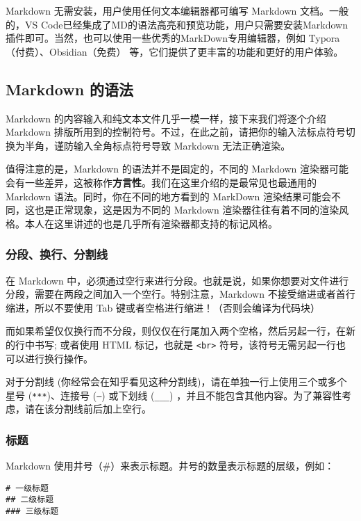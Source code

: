 \documentclass[../main.tex]{subfiles}
\begin{document}
Markdown 无需安装，用户使用任何文本编辑器都可编写 Markdown 文档。一般的，VS Code已经集成了MD的语法高亮和预览功能，用户只需要安装Markdown插件即可。当然，也可以使用一些优秀的MarkDown专用编辑器，例如 Typora（付费）、Obsidian（免费） 等，它们提供了更丰富的功能和更好的用户体验。

\subsection{Markdown 的语法}

Markdown 的内容输入和纯文本文件几乎一模一样，接下来我们将逐个介绍 Markdown 排版所用到的控制符号。不过，在此之前，请把你的输入法标点符号切换为半角，谨防输入全角标点符号导致 Markdown 无法正确渲染。

值得注意的是，Markdown 的语法并不是固定的，不同的 Markdown 渲染器可能会有一些差异，这被称作\textbf{方言性}。我们在这里介绍的是最常见也最通用的 Markdown 语法。同时，你在不同的地方看到的 MarkDown 渲染结果可能会不同，这也是正常现象，这是因为不同的 Markdown 渲染器往往有着不同的渲染风格。本人在这里讲述的也是几乎所有渲染器都支持的标记风格。

\subsubsection{分段、换行、分割线}

在 Markdown 中，必须通过空行来进行分段。也就是说，如果你想要对文件进行分段，需要在两段之间加入一个空行。特别注意，Markdown 不接受缩进或者首行缩进，所以不要使用 Tab 键或者空格进行缩进！（否则会编译为代码块）

而如果希望仅仅换行而不分段，则仅仅在行尾加入两个空格，然后另起一行，在新的行中书写; 或者使用 HTML 标记，也就是 \texttt{<br>} 符号，该符号无需另起一行也可以进行换行操作。

对于分割线 (你经常会在知乎看见这种分割线)，请在单独一行上使用三个或多个星号 (\texttt{***})、连接号 (\texttt{---}) 或下划线 (\texttt{\_\_\_}) ，并且不能包含其他内容。为了兼容性考虑，请在该分割线前后加上空行。

\subsubsection{标题}

Markdown 使用井号（\#）来表示标题。井号的数量表示标题的层级，例如：

\begin{lstlisting}
# 一级标题
## 二级标题
### 三级标题
\end{lstlisting}
\end{document}
